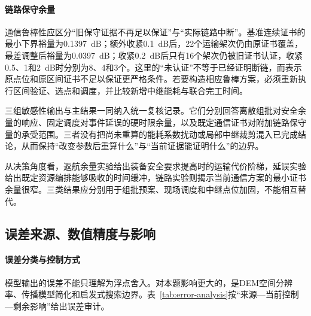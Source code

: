 \paragraph{链路保守余量}
通信鲁棒性应区分“旧保守证据不再足以保证”与“实际链路中断”。基准连续证书的最小下界裕量为0.1397~dB；额外收紧0.1~dB后，22个运输架次仍由原证书覆盖，最差调整后裕量为0.0397~dB；收紧0.2~dB后只有16个架次仍被旧证书认证，收紧0.5、1和2~dB时分别为8、4和3个。这里的“未认证”不等于已经证明断链，而表示原点位和原区间证书不足以保证更严格条件。若要构造相应鲁棒方案，必须重新执行区间验证、选点和调度，并比较新增中继能耗与联合完工时间。

三组敏感性输出与主结果一同纳入统一复核记录。它们分别回答离散组批对安全余量的响应、固定调度对事件延误的硬时限余量，以及既定通信证书对附加链路保守量的承受范围。三者没有把尚未重算的能耗系数扰动或局部中继裁剪混入已完成结论，从而保持“改变参数后重算什么”与“当前证据能证明什么”的边界。

从决策角度看，返航余量实验给出装备安全要求提高时的运输代价阶梯，延误实验给出既定资源编排能够吸收的时间缓冲，链路实验则揭示当前通信方案的最小证书余量很窄。三类结果应分别用于组批预案、现场调度和中继点位加固，不能相互替代。

\subsection{误差来源、数值精度与影响}
\paragraph{误差分类与控制方式}
模型输出的误差不能只理解为浮点舍入。对本题影响更大的，是DEM空间分辨率、传播模型简化和启发式搜索边界。表~\ref{tab:error-analysis}按“来源—当前控制—剩余影响”给出误差审计。

